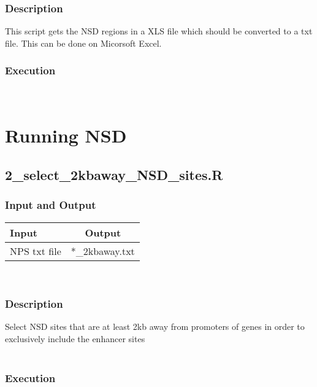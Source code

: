 \documentclass[14pt]{article}
\begin{document}
\subsubsection{Description}
This script gets the NSD regions in a XLS file which should be converted to a txt file. This can be done on Micorsoft Excel.
\\
\subsubsection{Execution}
\\

\section{Running NSD}
\subsection{2\_select\_2kbaway\_NSD\_sites.R}
\subsubsection{Input and Output}
\begin{tabular}{l |c }
Input & Output \\
\hline
NPS txt file & *\_2kbaway.txt\\
\end{tabular}\\
\subsubsection{Description}
Select NSD sites that are at least 2kb away from promoters of genes in order to exclusively include the enhancer sites\\
\\
\subsubsection{Execution}
\\
\end{document}
